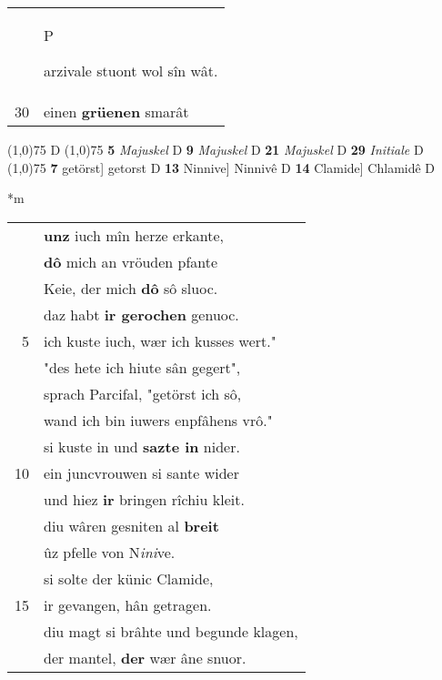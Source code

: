 \documentclass[8pt,a4paper,notitlepage]{article}
\begin{document}
\begin{table}[ht]
\begin{minipage}[t]{0.5\linewidth}
\begin{tabular}{rl}
 & \begin{large}P\end{large}arzivale stuont wol sîn wât.\\ 
30 & einen \textbf{grüenen} smarât\\ 
\end{tabular}
\scriptsize
\line(1,0){75} \newline
D \newline
\line(1,0){75} \newline
\textbf{5} \textit{Majuskel} D  \textbf{9} \textit{Majuskel} D  \textbf{21} \textit{Majuskel} D  \textbf{29} \textit{Initiale} D  \newline
\line(1,0){75} \newline
\textbf{7} getörst] getorst D \textbf{13} Ninnive] Ninnivê D \textbf{14} Clamide] Chlamidê D \newline
\end{minipage}
\hspace{0.5cm}
\begin{minipage}[t]{0.5\linewidth}
\small
\begin{center}*m
\end{center}
\begin{tabular}{rl}
 & \textbf{unz} iuch mîn herze erkante,\\ 
 & \textbf{dô} mich an vröuden pfante\\ 
 & Keie, der mich \textbf{dô} sô sluoc.\\ 
 & daz habt \textbf{ir gerochen} genuoc.\\ 
5 & ich kuste iuch, wær ich kusses wert."\\ 
 & "des hete ich hiute sân gegert",\\ 
 & sprach Parcifal, "getörst ich sô,\\ 
 & wand ich bin iuwers enpfâhens vrô."\\ 
 & si kuste in und \textbf{sazte in} nider.\\ 
10 & ein juncvrouwen si sante wider\\ 
 & und hiez \textbf{ir} bringen rîchiu kleit.\\ 
 & diu wâren gesniten al \textbf{breit}\\ 
 & ûz pfelle von N\textit{ini}ve.\\ 
 & si solte der künic Clamide,\\ 
15 & ir gevangen, hân getragen.\\ 
 & diu magt si brâhte und begunde klagen,\\ 
 & der mantel, \textbf{der} wær âne snuor.\\ 

\end{tabular}
\end{minipage}
\end{table}
\end{document}
